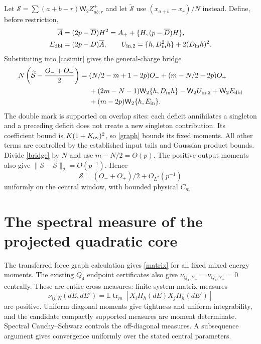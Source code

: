 \documentclass[11pt,a4paper]{article}
\newcommand{\EE}{\mathbb E}
\newcommand{\tr}{\operatorname{tr}}
\newcommand{\W}{\mathsf W_2}
\newcommand{\Db}{\overline D}
\begin{document}
Let $\mathcal S=\sum(a+b-r)\W Z^+_{ab;r}$ and let
$\widetilde{\mathcal S}$ use $(x_{a+b}-x_r)/N$ instead.
Define, before restriction,
\begin{align}
 \overline A&=(2p-\Db)H^2=A_++\{H,(p-\Db)H\},\\
 E_{\rm dbl}&=(2p-D)\overline A,\qquad
 U_{{\rm in},2}=\{h,D_{\rm in}^2h\}+2(D_{\rm in}h)^2.
\end{align}
Substituting into \eqref{casimir} gives the general-charge bridge
\begin{align}
 N\left(\widetilde{\mathcal S}-\frac{O_-+O_+}{2}\right)
 ={}&(N/2-m+1-2p)O_-+(m-N/2-2p)O_+\notag\\
 &+(2m-N-1)\W\{h,D_{\rm in}h\}-\W U_{{\rm in},2}
   +\W E_{\rm dbl}\notag\\
 &+(m-2p)\W\{h,E_{\rm in}\}.\label{bridge}
\end{align}
The double mark is supported on overlap sites: each deficit
annihilates a singleton and a preceding deficit does not create
a new singleton contribution. Its coefficient bound is
$K(1+K_{\rm ov})^2$, so \eqref{graph} bounds its fixed moments.
All other terms are controlled by the established input tails
and Gaussian product bounds. Divide \eqref{bridge} by $N$ and
use $m-N/2=O(p)$. The positive output moments also give
$\|\mathcal S-\widetilde{\mathcal S}\|_2=O(p^{-1})$. Hence
\begin{equation}
 \boxed{\quad\mathcal S=(O_-+O_+)/2+O_{L^2}(p^{-1})\quad}
 \label{strong}
\end{equation}
uniformly on the central window, with bounded physical $C_m$.

\newpage
\section{The spectral measure of the projected quadratic core}
The transferred force graph calculation gives \eqref{matrix} for
all fixed mixed energy moments. The existing $Q_4$ endpoint
certificates also give $\nu_{Q_4,Y_-}=\nu_{Q_4,Y_+}=0$ centrally.
These are entire cross measures: finite-system matrix measures
\begin{equation}
 \nu_{ij,N}(dE,dE')=\EE\tr_m[X_i\Pi_h(dE)X_j\Pi_h(dE')]
\end{equation}
are positive. Uniform diagonal moments give tightness and uniform
integrability, and the candidate compactly supported measures
are moment determinate. Spectral Cauchy--Schwarz controls the
off-diagonal measures. A subsequence argument gives convergence
uniformly over the stated central parameters.
\end{document}
